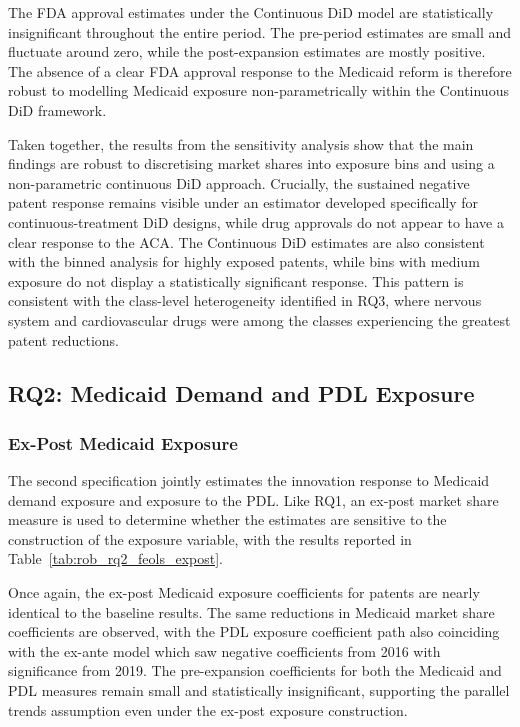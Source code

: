 \documentclass[12pt]{article}
\begin{document}
The FDA approval estimates under the Continuous DiD model are statistically insignificant throughout the entire period. The pre-period estimates are small and fluctuate around zero, while the post-expansion estimates are mostly positive. The absence of a clear FDA approval response to the Medicaid reform is therefore robust to modelling Medicaid exposure non-parametrically within the Continuous DiD framework.

Taken together, the results from the sensitivity analysis show that the main findings are robust to discretising market shares into exposure bins and using a non-parametric continuous DiD approach. Crucially, the sustained negative patent response remains visible under an estimator developed specifically for continuous-treatment DiD designs, while drug approvals do not appear to have a clear response to the ACA. The Continuous DiD estimates are also consistent with the binned analysis for highly exposed patents, while bins with medium exposure do not display a statistically significant response. This pattern is consistent with the class-level heterogeneity identified in RQ3, where nervous system and cardiovascular drugs were among the classes experiencing the greatest patent reductions.

\subsection{RQ2: Medicaid Demand and PDL Exposure}

\subsubsection{Ex-Post Medicaid Exposure}

The second specification jointly estimates the innovation response to Medicaid demand exposure and exposure to the PDL. Like RQ1, an ex-post market share measure is used to determine whether the estimates are sensitive to the construction of the exposure variable, with the results reported in Table~\ref{tab:rob_rq2_feols_expost}.

Once again, the ex-post Medicaid exposure coefficients for patents are nearly identical to the baseline results. The same reductions in Medicaid market share coefficients are observed, with the PDL exposure coefficient path also coinciding with the ex-ante model which saw negative coefficients from 2016 with significance from 2019. The pre-expansion coefficients for both the Medicaid and PDL measures remain small and statistically insignificant, supporting the parallel trends assumption even under the ex-post exposure construction.
\end{document}
